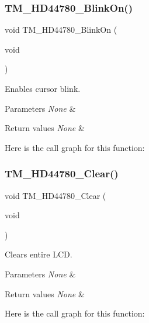 \subsubsection{\texorpdfstring{T\+M\+\_\+\+H\+D44780\+\_\+\+Blink\+On()}{TM\_HD44780\_BlinkOn()}}
{\footnotesize\ttfamily void T\+M\+\_\+\+H\+D44780\+\_\+\+Blink\+On (\begin{DoxyParamCaption}\item[{void}]{ }\end{DoxyParamCaption})}



Enables cursor blink. 


\begin{DoxyParams}{Parameters}
{\em None} & \\
\hline
\end{DoxyParams}

\begin{DoxyRetVals}{Return values}
{\em None} & \\
\hline
\end{DoxyRetVals}
Here is the call graph for this function\+:
\mbox{\label{group___t_m___h_d44780___functions_ga0a7a99ba13104c13646bbb40e5ee3bd9}} 
\subsubsection{\texorpdfstring{T\+M\+\_\+\+H\+D44780\+\_\+\+Clear()}{TM\_HD44780\_Clear()}}
{\footnotesize\ttfamily void T\+M\+\_\+\+H\+D44780\+\_\+\+Clear (\begin{DoxyParamCaption}\item[{void}]{ }\end{DoxyParamCaption})}



Clears entire L\+CD. 


\begin{DoxyParams}{Parameters}
{\em None} & \\
\hline
\end{DoxyParams}

\begin{DoxyRetVals}{Return values}
{\em None} & \\
\hline
\end{DoxyRetVals}
Here is the call graph for this function\+:
\mbox{\label{group___t_m___h_d44780___functions_ga32d98afae3fae1d278778dec7aac9130}} 
